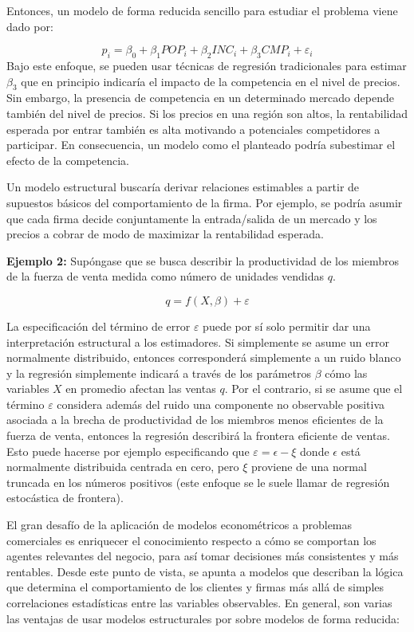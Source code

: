 \documentclass[
]{book}
\begin{document}
Entonces, un modelo de forma reducida sencillo para estudiar el problema viene dado por:

\[p_i = \beta_0+ \beta_1POP_i + \beta_2INC_i + \beta_3CMP_i + \varepsilon_i\]
Bajo este enfoque, se pueden usar técnicas de regresión tradicionales para estimar \(\beta_3\) que en principio indicaría el impacto de la competencia en el nivel de precios. Sin embargo, la presencia de competencia en un determinado mercado depende también del nivel de precios. Si los precios en una región son altos, la rentabilidad esperada por entrar también es alta motivando a potenciales competidores a participar. En consecuencia, un modelo como el planteado podría subestimar
el efecto de la competencia.

Un modelo estructural buscaría derivar relaciones estimables a partir de supuestos básicos del comportamiento de la firma. Por ejemplo, se podría asumir que cada firma decide conjuntamente la entrada/salida de un mercado y los precios a cobrar de modo de maximizar la rentabilidad esperada.

\textbf{Ejemplo 2:} Supóngase que se busca describir la productividad de los miembros de la fuerza de venta medida como número de unidades vendidas \(q\).

\[q=f(X,\beta)+\varepsilon\]

La especificación del término de error \(\varepsilon\) puede por sí solo permitir dar una interpretación estructural a los estimadores. Si simplemente se asume un error normalmente distribuido, entonces corresponderá simplemente a un ruido blanco y la regresión simplemente indicará a través de los parámetros \(\beta\) cómo las variables \(X\) en promedio afectan las ventas \(q\). Por el contrario, si se asume que el término \(\varepsilon\) considera además del ruido una componente no observable positiva asociada a la brecha de productividad de los miembros menos eficientes de la fuerza de venta, entonces la regresión describirá la frontera eficiente de ventas. Esto puede hacerse por ejemplo especificando que \(\varepsilon = \epsilon - \xi\) donde \(\epsilon\) está normalmente distribuida centrada en cero, pero \(\xi\) proviene de una normal truncada en los números positivos (este enfoque se le suele llamar de regresión estocástica de frontera).

El gran desafío de la aplicación de modelos econométricos a problemas comerciales es enriquecer el conocimiento respecto a cómo se comportan los agentes relevantes del negocio, para así tomar decisiones más consistentes y más rentables. Desde este punto de vista, se apunta a modelos que describan la lógica que determina el comportamiento de los clientes y firmas más allá de simples correlaciones estadísticas entre las variables observables. En general, son varias las ventajas de usar modelos estructurales por sobre modelos de forma reducida:
\end{document}
